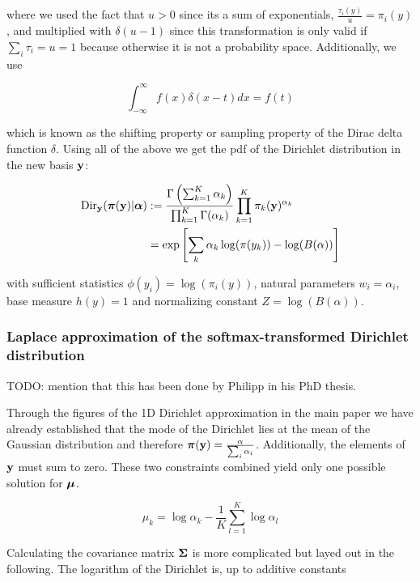where we used the fact that $u > 0$ since its a sum of exponentials, $\frac{\tau_i(y)}{u} = \pi_i(y)$, and multiplied with $\delta(u-1)$ since this transformation is only valid if $\sum_i \tau_i = u = 1$ because otherwise it is not a probability space. Additionally, we use

\begin{equation}
	\int_{-\infty}^{\infty} f(x)\delta(x-t)dx = f(t)
\end{equation}

which is known as the shifting property or sampling property of the Dirac delta function $\delta$. Using all of the above we get the pdf of the Dirichlet distribution in the new basis $\mathbf{y}$: 

\begin{subequations}
\begin{align}\label{eq:dirichlet_softmax}
\mathrm{Dir}_{\mathbf{y}}(\boldsymbol{\pi}(\mathbf{y}) | {\boldsymbol{\alpha}}) &:= \frac{\Gamma \left( \sum_{k=1}^K \alpha_k \right)}{\prod_{k=1}^K \Gamma(\alpha_k)} \prod_{k=1}^K \pi_k(\mathbf{y})^{\alpha_k}  \\
&= \exp\left[\sum_k\alpha_k\log(\pi(y_k)) - \log(B(\alpha))\right]
\end{align}
\end{subequations}

with sufficient statistics $\phi(y_i) = \log(\pi_i(y))$, natural parameters $w_i = \alpha_i$, base measure $h(y) = 1$ and normalizing constant $Z = \log(B(\alpha))$.

\subsubsection{Laplace approximation of the softmax-transformed Dirichlet distribution}

TODO: mention that this has been done by Philipp in his PhD thesis.

Through the figures of the 1D Dirichlet approximation in the main paper we have already established that the mode of the Dirichlet lies at the mean of the Gaussian distribution and therefore $\boldsymbol{\pi}(\mathbf{y}) = \frac{\mathbf{\alpha}}{\sum_i \alpha_i}$. Additionally, the elements of $\mathbf{y}$ must sum to zero. These two constraints combined yield only one possible solution for ${\boldsymbol{\mu}}$.

\begin{equation}
\mu_k = \log \alpha_k  - \frac{1}{K} \sum_{l=1}^{K} \log \alpha_l
\label{eq:mu_k}
\end{equation}

Calculating the covariance matrix ${\boldsymbol{\Sigma}}$ is more complicated but layed out in the following. The logarithm of the Dirichlet is, up to additive constants

